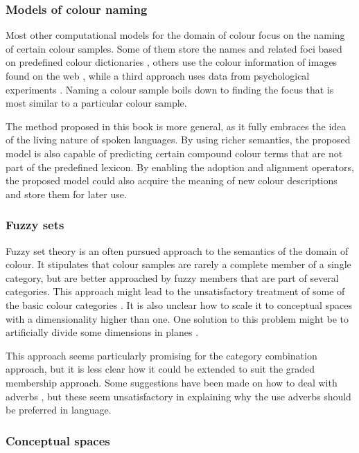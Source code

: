 \subsubsection{Models of colour naming}

Most other computational models for the domain of colour focus on the
naming of certain colour samples. Some of them store the names and
related foci based on predefined colour dictionaries
\citep{mojsilovic05computational}, others use the colour information
of images found on the web \citep{vandewijer07learning}, while a
third approach uses data from psychological experiments
\citep{menegaz07discrete}. Naming a colour sample boils down to
finding the focus that is most similar to a particular colour sample.

The method proposed in this book is more general, as it fully
embraces the idea of the living nature of spoken languages. By using
richer semantics, the proposed model is also capable of predicting
certain compound colour terms that are not part of the predefined
lexicon. By enabling the adoption and alignment operators, the
proposed model could also acquire the meaning of new colour
descriptions and store them for later use.

\subsubsection{Fuzzy sets}

Fuzzy set theory is an often pursued approach to the semantics of the
domain of colour. It stipulates that colour samples are rarely a
complete member of a single category, but are better approached by
fuzzy members that are part of several categories. This approach might
lead to the unsatisfactory treatment of some of the basic colour
categories \citep{kay78linguistic}. It is also unclear how to scale it
to conceptual spaces with a dimensionality higher than one. One
solution to this problem might be to artificially divide some
dimensions in planes \citep{benavente08parametric}.

This approach seems particularly promising for the category
  combination approach, but it is less clear how it could be extended
to suit the graded membership approach. Some suggestions have
been made on how to deal with adverbs \citep{hersh76fuzzy}, but these
seem unsatisfactory in explaining why the use adverbs should be
preferred in language.

\subsubsection{Conceptual spaces}

